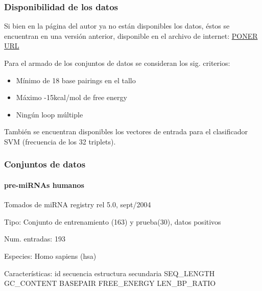 \documentclass[12pt,bibliography=openstyle,DIV=12,parskip=half-]{scrartcl}
\begin{document}
\subsubsection{Disponibilidad de los datos}
Si bien en la página del autor ya no están disponibles los datos, éstos se encuentran
en una versión anterior, disponible en el archivo de internet: \url{PONER URL}

Para el armado de los conjuntos de datos se consideran los sig. criterios:
\begin{itemize}
\item Mínimo de 18 base pairings en el tallo
\item Máximo -15kcal/mol de free energy
\item Ningún loop múltiple
\end{itemize}

También se encuentran disponibles los vectores de entrada para el
clasificador SVM (frecuencia de los 32 triplets).
%
\subsubsection{Conjuntos de datos}
\paragraph{pre-miRNAs humanos}
Tomados de miRNA registry rel 5.0, sept/2004
\begin{description*}
\item[Tipo:] Conjunto de entrenamiento (163) y prueba(30), datos positivos
\item[Num. entradas:] 193
\item[Especies:] Homo sapiens (hsa)
\item[Características:]
id \quad
secuencia \quad
estructura secundaria \quad
SEQ\_LENGTH \quad
GC\_CONTENT \quad
BASEPAIR \quad
FREE\_ENERGY \quad
LEN\_BP\_RATIO
\end{description*}




\end{document}
